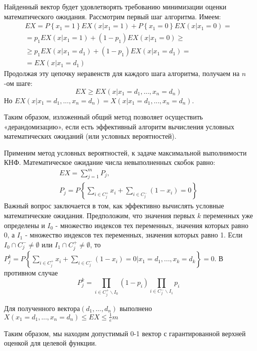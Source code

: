 \begin{problem}
Найденный вектор будет удовлетворять требованию минимизации оценки математического ожидания. Рассмотрим первый шаг алгоритма. Имеем:
\[\begin{array}{l} {EX=P\left\{x_{1} =1\right\}EX(x|x_{1} =1)+P\left\{x_{1} =0\right\}EX(x|x_{1} =0)=} \\ {=p_{1} EX(x|x_{1} =1)+(1-p_{1} )EX(x|x_{1} =0)\ge } \\ {\ge p_{1} EX(x|x_{1} =d_{1} )+(1-p_{1} )EX(x|x_{1} =d_{1} )=} \\ {=EX(x|x_{1} =d_{1} )} \end{array}\] 
Продолжая эту цепочку неравенств для каждого шага алгоритма, получаем на $n$-ом шаге:
\[EX\ge EX(x|x_{1} =d_{1} ,...,x_{n} =d_{n} )\] 
Но $EX(x|x_{1} =d_{1} ,...,x_{n} =d_{n} )=X(x|x_{1} =d_{1} ,...,x_{n} =d_{n} )$.

Таким образом, изложенный общий метод позволяет осуществить «дерандомизацию», если есть эффективный алгоритм вычисления условных математических ожиданий (или условных вероятностей).

Применим метод условных вероятностей, к задаче максимальной выполнимости КНФ. Математическое ожидание числа невыполненных скобок равно:
\[\begin{array}{l} {EX=\sum _{j=1}^{m}P_{j}  ,} \\ {P_{j} =P\left\{\sum _{i\in C_{j}^{+} }x_{i} +\sum _{i\in C_{j}^{-} }(1-x_{i} )  =0\right\}} \end{array}\] 
Важный вопрос заключается в том, как эффективно вычислять условные математические ожидания. Предположим, что значения первых $k$ переменных уже определены и $I_{0} $ - множество индексов тех переменных, значения которых равно 0, а $I_{1} $ - множество индексов тех переменных, значения которых равно 1. Если $I_{0} \cap C_{j}^{-} \ne \emptyset $ или $I_{1} \cap C_{j}^{+} \ne \emptyset $, то $P_{j} ^{k} =P\left\{\sum _{i\in C_{j}^{+} }x_{i} +\sum _{i\in C_{j}^{-} }(1-x_{i} )  =0|x_{1} =d_{1} ,...,x_{k} =d_{k} \right\}=0$. В противном случае
\[P_{j} ^{k} =\prod _{i\in C_{j}^{+} \backslash I_{0} }(1-p_{i} ) \prod _{i\in C_{j}^{-} \backslash I_{1} }p_{i}  \] 

 Для полученного вектора$(d_{1} ,...,d_{n} )$ выполнено$X\left(x_{1} =d_{1} ,...,x_{n} =d_{n} \right)\le EX\le \frac{1}{e} m$

\noindent Таким образом, мы находим допустимый 0-1 вектор с гарантированной верхней оценкой для целевой функции.

\end{problem}


